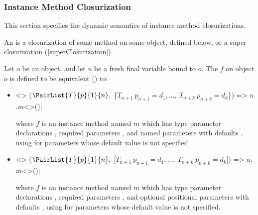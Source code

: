 \documentclass[makeidx]{article}
\begin{document}
{


\subsubsection{Instance Method Closurization}

\LMHash{}%
This section specifies the dynamic semantics of instance method closurizations.


\LMHash{}%
An 
is a closurization of some method on some object, defined below,
or a super closurization (\ref{superClosurization}).

\LMHash{}%
Let $o$ be an object, and let $u$ be a fresh final variable bound to $o$.
The  $f$ on object $o$
is defined to be equivalent
() to:

\begin{itemize}
\item
\begin{normativeDartCode}
<>
($\PairList{T}{p}{1}{n},\ $\{$T_{n+1}\ p_{n+1} = d_1, \ldots,\ T_{n+k}\ p_{n+k} = d_k$\}) =>
\quad$u$.$m$<>();
\end{normativeDartCode}
  where $f$ is an instance method named $m$
  which has type parameter declarations
  \TypeParametersStd,
  required parameters ,
  and named parameters  with defaults ,
  using \NULL{} for parameters whose default value is not specified.
\item
\begin{normativeDartCode}
<>
($\PairList{T}{p}{1}{n},\ $[$T_{n+1}\ p_{n+1} = d_1, \ldots,\ T_{n+k}\ p_{n+k} = d_k$]) =>
\quad$u$.$m$<>();
\end{normativeDartCode}
  where $f$ is an instance method named $m$
  which has type parameter declarations
  \TypeParametersStd,
  required parameters ,
  and optional positional parameters
   with defaults ,
  using \NULL{} for parameters whose default value is not specified.
\end{itemize}

}
\end{document}
